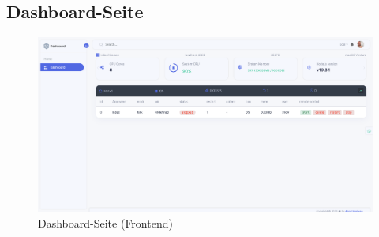 \subsection{Dashboard-Seite}\label{appendix:b5}\par
\begin{figure}[htbp]
	\centering
	\includegraphics[width=1\textwidth]{img/dashboard.png}
	\caption{Dashboard-Seite (Frontend)}
\end{figure}
\clearpage

